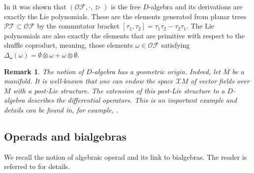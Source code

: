 \documentclass[10pt,a4paper]{article}
\newtheorem{remark}{Remark}
\DeclareMathOperator{\graft}{\triangleright}
\begin{document}
In \cite{Munthe-KaasWright2008} it was shown that $(\mathcal{OF},\cdot,\graft)$ is the free $D$-algebra and its derivations are exactly the Lie polynomials. These are the elements generated from planar trees $\mathcal{PT} \subset \mathcal{OF}$ by the commutator bracket $[\tau_1,\tau_2]=\tau_1\tau_2-\tau_2\tau_1$. The Lie polynomials are also exactly the elements that are primitive with respect to the shuffle coproduct, meaning, those elements $\omega \in \mathcal{OF}$ satisfying $\Delta_{\shuffle}(\omega)= \emptyset \otimes \omega + \omega \otimes \emptyset$. \\


\begin{remark}
\label{rmk:vectorfields1}
The notion of $D$-algebra has a geometric origin. Indeed, let $M$ be a manifold. It is well-known that one can endow the space $\mathcal{X}M$ of vector fields over $M$ with a post-Lie structure. The extension of this post-Lie structure to a $D$-algebra describes the differential operators. This is an important example and details can be found in, for example, \cite{LundervoldMunthe-Kaas2011,Munthe-KaasLundervold2012,Munthe-KaasWright2008}.
\end{remark}


\subsection{Operads and bialgebras} 
\label{ssec:operads}

We recall the notion of algebraic operad and its link to bialgebras. The reader is referred to \cite{ChapotonLivernet2001,Foissy2017,ManchonHopf} for details. \\
\end{document}
